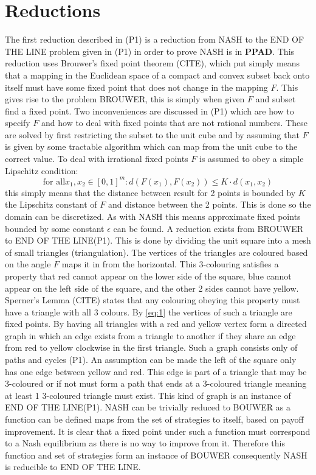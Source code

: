\documentclass[]{article}
\begin{document}
\section*{Reductions}
The first reduction described in (P1) is a reduction from \textsc{NASH} to the \textsc{END OF THE LINE} problem given in (P1) in order to prove \textsc{NASH} is in \textbf{PPAD}. This reduction uses Brouwer's fixed point theorem (CITE), which put simply means that a mapping in the Euclidean space of a compact and convex subset back onto itself must have some fixed point that does not change in the mapping $F$. This gives rise to the problem \textsc{BROUWER}, this is simply when given $F$ and subset find a fixed point. Two inconveniences are discussed in (P1) which are how to specify $F$ and how to deal with fixed points that are not rational numbers. These are solved by first restricting the subset to the unit cube and by assuming that $F$ is given by some tractable algorithm which can map from the unit cube to the correct value. To deal with irrational fixed points $F$ is assumed to obey a simple Lipschitz condition:
\begin{equation}
	\text{for all}x_1,x_2\in[0,1]^m:d(F(x_1),F(x_2))\leq K\cdot d(x_1,x_2)
	\label{eq:1}
\end{equation}
this simply means that the distance between result for 2 points is bounded by $K$ the Lipschitz constant of $F$ and distance between the 2 points. This is done so the domain can be discretized. As with \textsc{NASH} this means approximate fixed points bounded by some constant $\epsilon$ can be found. A reduction exists from \textsc{BROUWER} to \textsc{END OF THE LINE}(P1). This is done by dividing the unit square into a mesh of small triangles (triangulation). The vertices of the triangles are coloured based on the angle $F$ maps it in from the horizontal. This 3-colouring satisfies a property that red cannot appear on the lower side of the square, blue cannot appear on the left side of the square, and the other 2 sides cannot have yellow. Sperner's Lemma (CITE) states that any colouring obeying this property must have a triangle with all 3 colours. By \autoref{eq:1} the vertices of such a triangle are fixed points. By having all triangles with a red and yellow vertex form a directed graph in which an edge exists from a triangle to another if they share an edge from red to yellow clockwise in the first triangle. Such a graph consists only of paths and cycles (P1). An assumption can be made the left of the square only has one edge between yellow and red. This edge is part of a triangle that may be 3-coloured or if not must form a path that ends at a 3-coloured triangle meaning at least 1 3-coloured triangle must exist. This kind of graph is an instance of \textsc{END OF THE LINE}(P1). \textsc{NASH} can be trivially reduced to \textsc{BOUWER} as a function can be defined maps from the set of strategies to itself, based on payoff improvement. It is clear that a fixed point under such a function must correspond to a Nash equilibrium as there is no way to improve from it. Therefore this function and set of strategies form an instance of \textsc{BOUWER} consequently \textsc{NASH} is reducible to \textsc{END OF THE LINE}.\par
\end{document}

